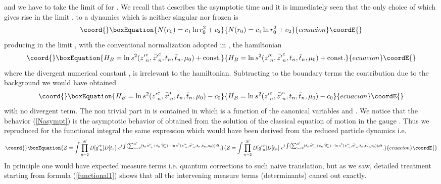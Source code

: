 \documentclass[a4paper,12pt]{article}
\begin{document}
and we have to take the limit of \coordHE{} for \coordHE{}. We
recall that \coordHE{} describes the asymptotic time and it is
immediately seen that the only choice of \coordHE{} which gives rise in
the limit \coordHE{}, to a dynamics which is neither
singular nor frozen is 
\begin{equation}\coord{}\boxEquation{\label{Nasympt}
N(r_0)=c_1\ln r^2_0 +c_2
}{N(r_0)=c_1\ln r^2_0 +c_2
}{ecuacion}\coordE{}\end{equation}
producing  in the limit \coordHE{}, with
the conventional normalization adopted in \cite{CMS1}
\coordHE{}, the hamiltonian 
\begin{equation}\coord{}\boxEquation{
H_B = \ln s^2({z'}^c_n,\bar{z'}^c_n, t_n,\bar t_n,\mu_0) + {\rm const.}
}{
H_B = \ln s^2({z'}^c_n,\bar{z'}^c_n, t_n,\bar t_n,\mu_0) + {\rm const.}
}{ecuacion}\coordE{}\end{equation}
where the divergent numerical constant \coordHE{}, is irrelevant to the hamiltonian. Subtracting to
the boundary terms the contribution due to the background we would
have obtained
\begin{equation}\coord{}\boxEquation{
H_B = \ln s^2({z'}^c_n,\bar{z'}^c_n, t_n,\bar t_n,\mu_0) - c_0
}{
H_B = \ln s^2({z'}^c_n,\bar{z'}^c_n, t_n,\bar t_n,\mu_0) - c_0
}{ecuacion}\coordE{}\end{equation}
with no divergent term. 
The non trivial part in \coordHE{} is contained in \coordHE{} which is a
function of the canonical variables \coordHE{} and \coordHE{}. 
We notice that the behavior (\ref{Nasympt}) is the asymptotic
behavior of \coordHE{} 
obtained from the solution of the classical equation of motion in
the \coordHE{} gauge \cite{CMS1}. Thus we reproduced for the functional
integral the 
same expression which would have been derived from the reduced
particle dynamics i.e.
\begin{equation}\coord{}\boxEquation{\label{reduced2}
Z=\int \prod_{n=2}^{\cal N}D[{q'}^c_n]D[t_n]~e^{i\int (\sum_{n=2}^{\cal
N}(t_n\dot {z'}^c_n + \bar t_n \dot{\bar z'}^c_n) - 
\ln s^2({z'}^c_n,\bar{z'}^c_n, t_n,\bar t_n,\mu_0))dt}.  
}{Z=\int \prod_{n=2}^{\cal N}D[{q'}^c_n]D[t_n]~e^{i\int (\sum_{n=2}^{\cal
N}(t_n\dot {z'}^c_n + \bar t_n \dot{\bar z'}^c_n) - 
\ln s^2({z'}^c_n,\bar{z'}^c_n, t_n,\bar t_n,\mu_0))dt}.  
}{ecuacion}\coordE{}\end{equation}
In principle one would have expected measure terms
i.e. quantum corrections to such naive translation, but as we saw,
detailed treatment starting from formula (\ref{functional1}) shows
that all the 
intervening measure terms (determinants) cancel out exactly.
\end{document}
